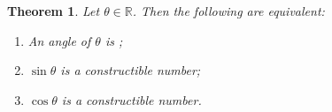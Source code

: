 \documentclass[12pt]{article}
\newtheorem{thm*}{Theorem}
\begin{document}

\begin{thm*}
Let $\theta \in \mathbb{R}$.  Then the following are equivalent:

\begin{enumerate}
\item An angle of  $\theta$ is ;
\item $\sin \theta$ is a constructible number;
\item $\cos \theta$ is a constructible number.
\end{enumerate}
\end{thm*}
\end{document}
